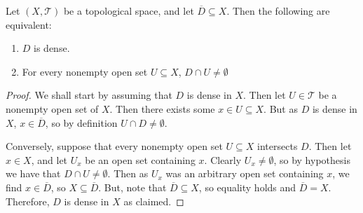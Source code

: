 \documentclass[12pt, a4paper, oneside, openright, titlepage]{book}
\begin{document}
\begin{proposition}
    Let $(X,\mathcal{T})$ be a topological space, and let $\overline{D} \subseteq X$. Then the following are equivalent: \begin{enumerate}
        \item $D$ is dense.
        \item For every nonempty open set $U \subseteq X$, $D\cap U \neq \emptyset$
    \end{enumerate}
\end{proposition}
\begin{proof}
    We shall start by assuming that $D$ is dense in $X$. Then let $U \in \mathcal{T}$ be a nonempty open set of $X$. Then there exists some $x \in U \subseteq X$. But as $D$ is dense in $X$, $x \in \overline{D}$, so by definition $U \cap D \neq \emptyset$.


    Conversely, suppose that every nonempty open set $U\subseteq X$ intersects $D$. Then let $x \in X$, and let $U_x$ be an open set containing $x$. Clearly $U_x \neq \emptyset$, so by hypothesis we have that $D\cap U \neq \emptyset$. Then as $U_x$ was an arbitrary open set containing $x$, we find $x \in \overline{D}$, so $X\subseteq \overline{D}$. But, note that $\overline{D} \subseteq X$, so equality holds and $\overline{D} = X$. Therefore, $D$ is dense in $X$ as claimed.
\end{proof}
\end{document}
